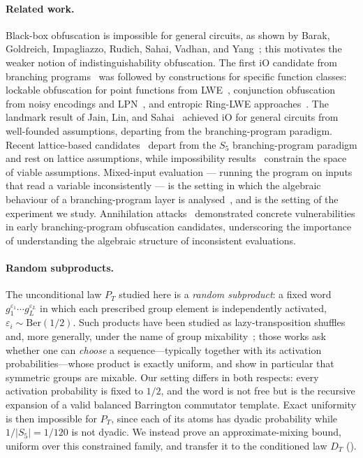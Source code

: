 \documentclass[version=final]{iacrcc}
\newcommand{\abs}[1]{\lvert #1 \rvert}
\begin{document}
\paragraph{Related work.}
Black-box obfuscation is impossible for general circuits, as shown by Barak,
Goldreich, Impagliazzo, Rudich, Sahai, Vadhan, and Yang~\cite{BGHSV01}; this
motivates the weaker notion of indistinguishability obfuscation.
The first iO candidate from branching programs~\cite{GGH+13} was followed
by constructions for specific function
classes: lockable obfuscation for point functions from
LWE~\cite{GKW17,WZ17}, conjunction obfuscation from noisy encodings
and LPN~\cite{BKMPRS18,BLMZ19}, and entropic Ring-LWE
approaches~\cite{BVWW16}.  The landmark result of Jain, Lin, and
Sahai~\cite{JLS21} achieved iO for general circuits from well-founded
assumptions, departing from the branching-program paradigm.  Recent
lattice-based candidates~\cite{BDGM20,WW21,HJL25} depart from the $S_5$
branching-program paradigm and rest on lattice assumptions, while impossibility
results~\cite{DJMMV25} constrain the space of viable assumptions. Mixed-input
evaluation --- running the program on inputs that read a variable
inconsistently --- is the setting in which the algebraic behaviour of a
branching-program layer is analysed~\cite{CVW18}, and is the setting of the
experiment we study.  Annihilation attacks~\cite{MSZ16} demonstrated
concrete vulnerabilities in early branching-program obfuscation candidates,
underscoring the importance of understanding the algebraic structure of
inconsistent evaluations.

\paragraph{Random subproducts.}
The unconditional law $P_T$ studied here is a \emph{random subproduct}: a fixed
word $g_1^{\varepsilon_1}\cdots g_L^{\varepsilon_L}$ in which each prescribed
group element is independently activated, $\varepsilon_i \sim \mathrm{Ber}(1/2)$.
Such products have been studied as lazy-transposition shuffles and, more
generally, under the name of group mixability~\cite{AH18,ABGV25}; those works ask
whether one can \emph{choose} a sequence---typically together with its activation
probabilities---whose product is exactly uniform, and show in particular that
symmetric groups are mixable. Our setting differs in both respects: every
activation probability is fixed to $1/2$, and the word is not free but is the
recursive expansion of a valid balanced Barrington commutator template. Exact
uniformity is then impossible for $P_T$, since each of its atoms has dyadic
probability while $1/\abs{S_5} = 1/120$ is not dyadic. We instead prove an
approximate-mixing bound, uniform over this constrained family, and transfer it
to the conditioned law $D_T$ ().
\end{document}
